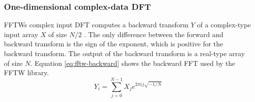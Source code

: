 \documentclass[a4paper,11pt]{report}
\begin{document}
\subsubsection{One-dimensional complex-data DFT}
FFTWs complex input DFT computes a backward transform $Y$ of a complex-type input array $X$ of size $N/2$ \cite{frigo2005design}. The only difference between the forward and backward transform is the sign of the exponent, which is positive for the backward transform. The output of the backward transform is a real-type array of size $N$. Equation \ref{eq:fftw-backward} shows the backward FFT used by the FFTW library.
\begin{equation}
Y _ { i } = \sum _ { j = 0 } ^ { N - 1 } X _ { j } e ^ { 2 \pi i j \sqrt { - 1 / N } }
\label{eq:fftw-backward}
\end{equation}
\end{document}

